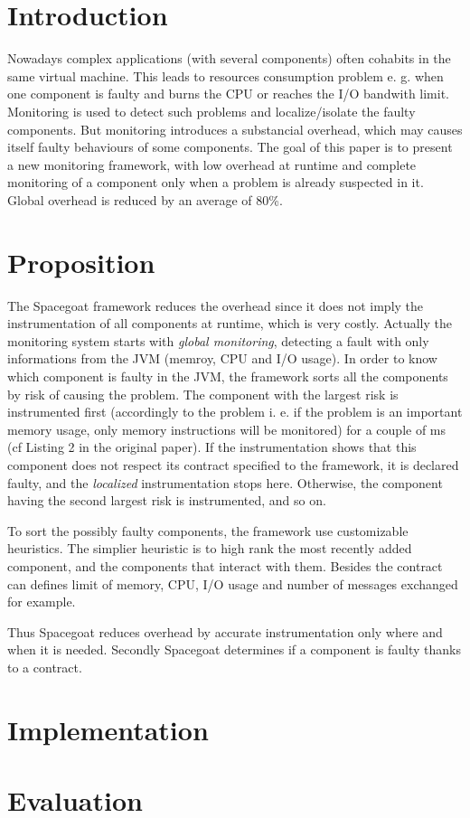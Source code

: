 \section{Introduction}

Nowadays complex applications (with several components) often cohabits in the same virtual machine. This leads to resources consumption problem e. g. when one component is faulty and burns the CPU or reaches the I/O bandwith limit. Monitoring is used to detect such problems and localize/isolate the faulty components. But monitoring introduces a substancial overhead, which may causes itself faulty behaviours of some components. The goal of this paper is to present a new monitoring framework, with low overhead at runtime and complete monitoring of a component only when a problem is already suspected in it. Global overhead is reduced by an average of 80\%.

\section{Proposition}

The \textsf{Spacegoat} framework reduces the overhead since it does not imply the instrumentation of all components at runtime, which is very costly. Actually the monitoring system starts with \emph{global monitoring}, detecting a fault with only informations from the JVM (memroy, CPU and I/O usage). In order to know which component is faulty in the JVM, the framework sorts all the components by risk of causing the problem. The component with the largest risk is instrumented first (accordingly to the problem i. e. if the problem is an important memory usage, only memory instructions will be monitored) for a couple of ms (cf Listing 2 in the original paper). If the instrumentation shows that this component does not respect its contract specified to the framework, it is declared faulty, and the \emph{localized} instrumentation stops here. Otherwise, the component having the second largest risk is instrumented, and so on. 

To sort the possibly faulty components, the framework use customizable heuristics. The simplier heuristic is to high rank the most recently added component, and the components that interact with them. Besides the contract can defines limit of memory, CPU, I/O usage and number of messages exchanged for example.

Thus \textsf{Spacegoat} reduces overhead by accurate instrumentation only where and when it is needed. Secondly \textsf{Spacegoat} determines if a component is faulty thanks to a contract. 

\section{Implementation}



\section{Evaluation}
